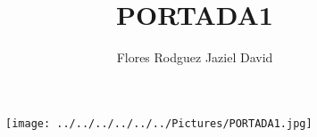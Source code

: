 \documentclass[11pt,a4paper]{article}
\author{Flores Rodguez Jaziel David }
\title{PORTADA1}
\begin{document}
\begin{figure}
\centering
\texttt{[image: ../../../../../../Pictures/PORTADA1.jpg]} 
\end{figure}
\end{document}
